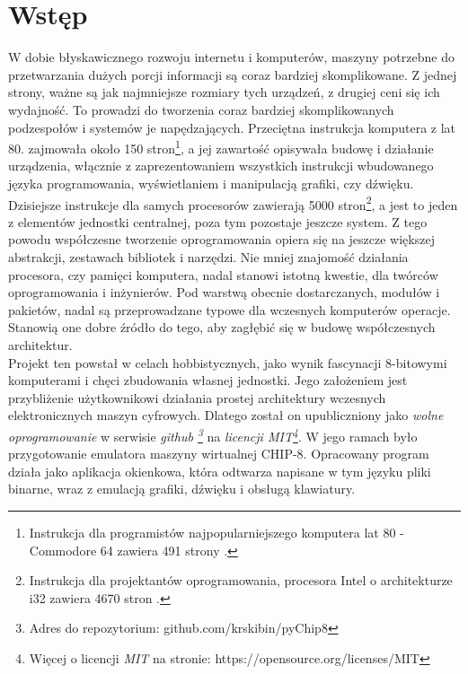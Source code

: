\section{Wstęp}
W dobie błyskawicznego rozwoju internetu i komputerów, maszyny potrzebne do przetwarzania dużych porcji informacji są coraz bardziej skomplikowane. Z jednej strony, ważne są jak najmniejsze rozmiary tych urządzeń, z drugiej ceni się ich wydajność. To prowadzi do tworzenia coraz bardziej skomplikowanych podzespołów i systemów je napędzających. Przeciętna instrukcja komputera z lat 80. zajmowała około 150 stron\footnote{Instrukcja dla programistów najpopularniejszego komputera lat 80 - Commodore 64 zawiera 491 strony \cite{Commodore}.}, a jej zawartość opisywała budowę i działanie urządzenia, włącznie z zaprezentowaniem wszystkich instrukcji wbudowanego języka programowania, wyświetlaniem i manipulacją grafiki, czy dźwięku. Dzisiejsze instrukcje dla samych procesorów zawierają 5000 stron\footnote{Instrukcja dla projektantów oprogramowania, procesora Intel o architekturze i32 zawiera 4670 stron \cite{Intel}.}, a jest to jeden z elementów jednostki centralnej, poza tym pozostaje jeszcze system. Z tego powodu współczesne tworzenie oprogramowania opiera się na jeszcze większej abstrakcji, zestawach bibliotek i narzędzi. Nie mniej znajomość działania procesora, czy pamięci komputera, nadal stanowi istotną kwestie, dla twórców oprogramowania i inżynierów. Pod warstwą obecnie dostarczanych, modułów i pakietów, nadal są przeprowadzane typowe dla wczesnych komputerów operacje. Stanowią one dobre źródło do tego, aby zagłębić się w budowę współczesnych architektur. \\

Projekt ten powstał w celach hobbistycznych, jako wynik fascynacji 8-bitowymi komputerami i chęci zbudowania własnej jednostki. Jego założeniem jest przybliżenie użytkownikowi działania prostej architektury wczesnych elektronicznych maszyn cyfrowych. Dlatego został on upubliczniony jako \textit{wolne oprogramowanie} w serwisie \textit{github \footnote{Adres do repozytorium: github.com/krskibin/pyChip8 }} na \textit{licencji MIT\footnote{Więcej o licencji \textit{MIT} na stronie: https://opensource.org/licenses/MIT}}. W jego ramach było przygotowanie emulatora maszyny wirtualnej CHIP-8. Opracowany program działa jako aplikacja okienkowa, która odtwarza napisane w tym języku pliki binarne, wraz z emulacją grafiki, dźwięku i obsługą klawiatury. \\


